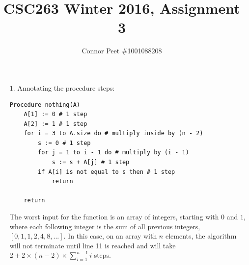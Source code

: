 \documentclass{article}
\title{CSC263 Winter 2016, Assignment 3}
\author{Connor Peet \#1001088208}
\begin{document}
\maketitle

\lstset{
    numbers=left
}

\begin{enumerate}
\item [1.]
    Annotating the procedure steps:

    \begin{lstlisting}
Procedure nothing(A)
    A[1] := 0 # 1 step
    A[2] := 1 # 1 step
    for i = 3 to A.size do # multiply inside by (n - 2)
        s := 0 # 1 step
        for j = 1 to i - 1 do # multiply by (i - 1)
            s := s + A[j] # 1 step
        if A[i] is not equal to s then # 1 step
            return

    return
    \end{lstlisting}

    The worst input for the function is an array of integers, starting with $0$ and $1$, where each following integer is the sum of all previous integers, $[0, 1, 1, 2, 4, 8, ...]$. In this case, on an array with $n$ elements, the algorithm will not terminate until line 11 is reached and will take $2 + 2 \times (n - 2) \times \sum_{i = 1}^{n - 1} i$ steps.


\end{enumerate}
\end{document}
